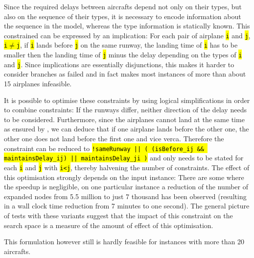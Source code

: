 \documentclass[,%
			paper=a4,%
			DIV12,
			liststotoc,
			bibtotoc,
			draft=false,%
			numbers=noendperiod
			]{scrartcl}
\newcommand{\ilc}[1]{\hl{\texttt{#1}}}
\newcommand{\mymarginnote}[1]{\marginnote{\footnotesize{#1}}}
\begin{document}
\mymarginnote{\CseqDel}
Since the required delays between aircrafts depend not only on their types, but also on the sequence of their types, it is necessary to encode information about the sequence in the model, whereas the type information is statically known.
This constrained can be expressed by an implication: For each pair of airplane \ilc{i} and \ilc{j}, \ilc{i$\neq$j}, if \ilc{i} lands before \ilc{j} on the same runway, the landing time of \ilc{i} has to be smaller then the landing time of \ilc{j} minus the delay depending on the types of \ilc{i} and \ilc{j}.
Since implications are essentially disjunctions, this makes it harder to consider branches as failed and in fact makes most instances of more than about 15 airplanes infeasible.

It is possible to optimise these constraints by using logical simplifications in order to combine constraints: If the runways differ, neither direction of the delay needs to be considered. Furthermore, since the airplanes cannot land at the same time as ensured by \Crunway, we can deduce that if one airplane lands before the other one, the other one does not land before the first one and vice verca. Therefore the constraint can be reduced to \ilc{!sameRunway || ( (isBefore\_ij \&\& maintainsDelay\_ij) || maintainsDelay\_ji )} and only needs to be stated for each \ilc{i} and \ilc{j} with \ilc{i<j}, thereby halvening the number of constraints.
The effect of this optimisation strongly depends on the input instance: There are some where the speedup is negligible, on one particular instance a reduction of the number of expanded nodes from 5.5 million to just 7 thousand has been observed (resulting in a wall clock time reduction from 7 minutes to one second).
The general picture of tests with these variants suggest that the impact of this constraint on the search space is a measure of the amount of effect of this optimisation.

This formulation however still is hardly feasible for instances with more than 20 aircrafts. 



 
\end{document}

